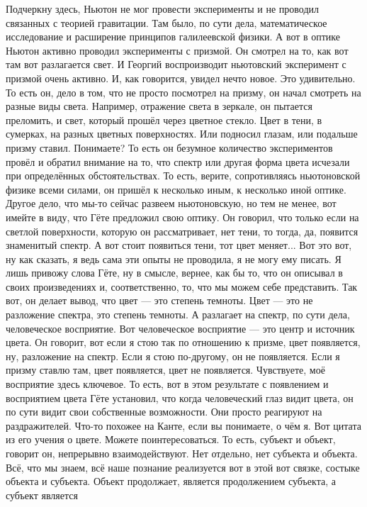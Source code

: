 Подчеркну здесь, Ньютон не мог провести эксперименты и не проводил связанных с
теорией гравитации. Там было, по сути дела, математическое исследование и
расширение принципов галилеевской физики. А вот в оптике Ньютон активно проводил
эксперименты с призмой. Он смотрел на то, как вот там вот разлагается свет. И
Георгий воспроизводит ньютовский эксперимент с призмой очень активно. И, как
говорится, увидел нечто новое. Это удивительно. То есть он, дело в том, что не
просто посмотрел на призму, он начал смотреть на разные виды света. Например,
отражение света в зеркале, он пытается преломить, и свет, который прошёл через
цветное стекло. Цвет в тени, в сумерках, на разных цветных поверхностях. Или
подносил глазам, или подальше призму ставил. Понимаете? То есть он безумное
количество экспериментов провёл и обратил внимание на то, что спектр или другая
форма цвета исчезали при определённых обстоятельствах. То есть, верите,
сопротивляясь ньютоновской физике всеми силами, он пришёл к несколько иным, к
несколько иной оптике. Другое дело, что мы-то сейчас развеем ньютоновскую, но
тем не менее, вот имейте в виду, что Гёте предложил свою оптику. Он говорил, что
только если на светлой поверхности, которую он рассматривает, нет тени, то
тогда, да, появится знаменитый спектр. А вот стоит появиться тени, тот цвет
меняет... Вот это вот, ну как сказать, я ведь сама эти опыты не проводила, я не
могу ему писать. Я лишь привожу слова Гёте, ну в смысле, вернее, как бы то, что
он описывал в своих произведениях и, соответственно, то, что мы можем себе
представить. Так вот, он делает вывод, что цвет — это степень темноты. Цвет —
это не разложение спектра, это степень темноты. А разлагает на спектр, по сути
дела, человеческое восприятие. Вот человеческое восприятие — это центр и
источник цвета. Он говорит, вот если я стою так по отношению к призме, цвет
появляется, ну, разложение на спектр. Если я стою по-другому, он не появляется.
Если я призму ставлю там, цвет появляется, цвет не появляется. Чувствуете, моё
восприятие здесь ключевое. То есть, вот в этом результате с появлением и
восприятием цвета Гёте установил, что когда человеческий глаз видит цвета, он по
сути видит свои собственные возможности. Они просто реагируют на раздражителей.
Что-то похожее на Канте, если вы понимаете, о чём я. Вот цитата из его учения о
цвете. Можете поинтересоваться. То есть, субъект и объект, говорит он,
непрерывно взаимодействуют. Нет отдельно, нет субъекта и объекта. Всё, что мы
знаем, всё наше познание реализуется вот в этой вот связке, состыке объекта и
субъекта. Объект продолжает, является продолжением субъекта, а субъект является
